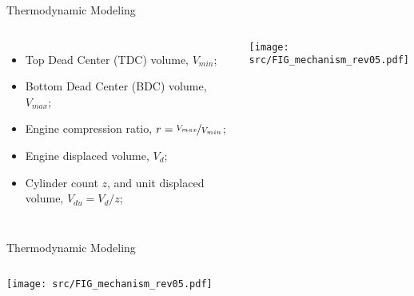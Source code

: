 \begin{frame}{Thermodynamic Modeling}
\begin{columns}
{\begin{itemize}
                    \item Top Dead Center (TDC) volume, \alert{$V_{min}$};
                    \item Bottom Dead Center (BDC) volume, \alert{$V_{max}$};
                    \item Engine compression ratio, \alert{$r=\nicefrac{V_{max}}{V_{min}}$};
                    \item Engine displaced volume, \alert{$V_{d}$};
                    \item Cylinder count \alert{$z$}, and unit displaced volume,
                        \alert{$V_{du}=V_d/z$};
                \end{itemize}
            }

        \vspace*{-4mm}%
        \hspace*{-6mm}\texttt{[image: src/FIG\_mechanism\_rev05.pdf]}

        \end{columns}
    \end{frame}

    \begin{frame}{Thermodynamic Modeling}\vspace*{-2em}
        \begin{columns}

        \vspace*{-4mm}%
        \hspace*{-6mm}\texttt{[image: src/FIG\_mechanism\_rev05.pdf]}

        \end{columns}
    \end{frame}

